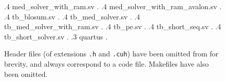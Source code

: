 \begin{figure}[H]
{            .4 med\_solver\_with\_ram.sv .
            .4 med\_solver\_with\_ram\_avalon.sv .
            .4 tb\_blosum.sv .
            .4 tb\_med\_solver.sv .
            .4 tb\_med\_solver\_with\_ram.sv .
            .4 tb\_pe.sv .
            .4 tb\_short\_seq.sv .
            .4 tb\_short\_solver.sv .
        .3 quartus .
}
\caption{Header files (of extensions \lstinline{.h} and \lstinline{.cuh}) have been omitted from for brevity, and always correspond to a code file. Makefiles have also been omitted.}
\label{fig:Repo_tree}
\end{figure}
